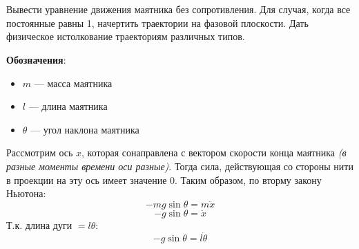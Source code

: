 

\usepackage{svg}

\cfoot{}



\section{}

Вывести уравнение движения маятника без сопротивления. Для случая, когда все постоянные равны 1, начертить траектории на фазовой плоскости. Дать физическое истолкование траекториям различных типов.

\textbf{Обозначения}:
\begin{itemize}
    \item \(m\) --- масса маятника
    \item \(l\) --- длина маятника
    \item \(\theta\) --- угол наклона маятника
\end{itemize}

Рассмотрим ось \(x\), которая сонаправлена с вектором скорости конца маятника \textit{(в разные моменты времени оси разные)}. Тогда сила, действующая со стороны нити в проекции на эту ось имеет значение \(0\). Таким образом, по вторму закону Ньютона:
\[ - mg \sin \theta = m\ddot x\]
\[ - g \sin \theta = \ddot x\]
Т.к. длина дуги \( = l \theta\):
\[ - g \sin \theta = l \ddot \theta\]







